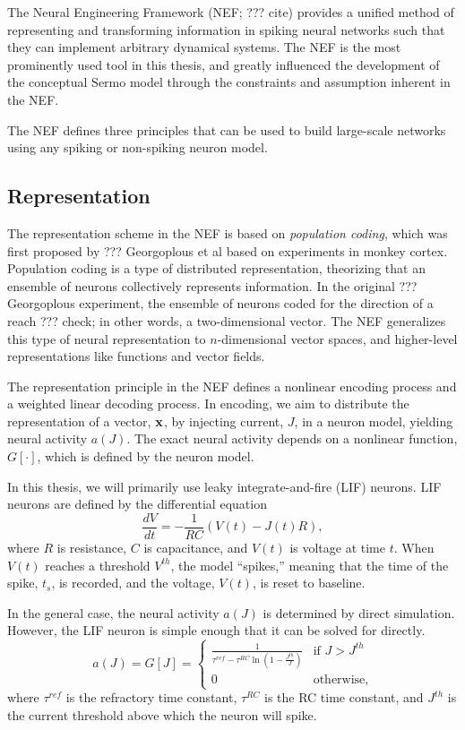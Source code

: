 The Neural Engineering Framework (NEF; ??? cite)
provides a unified method of
representing and transforming information
in spiking neural networks
such that they can implement
arbitrary dynamical systems.
The NEF is the most prominently used
tool in this thesis,
and greatly influenced the
development of the conceptual Sermo model
through the constraints and assumption
inherent in the NEF.

The NEF defines three principles that
can be used to build large-scale networks
using any spiking or non-spiking neuron model.

\subsection{Representation}
\label{sec:representation}

The representation scheme in the NEF
is based on \textit{population coding},
which was first proposed by
??? Georgoplous et al
based on experiments in monkey cortex.
Population coding is a type of distributed representation,
theorizing that an ensemble of neurons
collectively represents information.
In the original ??? Georgoplous experiment,
the ensemble of neurons coded
for the direction of a reach ??? check;
in other words,
a two-dimensional vector.
The NEF generalizes
this type of neural representation to
$n$-dimensional vector spaces,
and higher-level representations
like functions and vector fields.

The representation principle in the NEF
defines a nonlinear encoding process
and a weighted linear decoding process.
In encoding,
we aim to distribute the representation
of a vector, $\mathbf{x}$,
by injecting current, $J$,
in a neuron model,
yielding neural activity $a(J)$.
The exact neural activity depends on
a nonlinear function, $G[\cdot]$,
which is defined by the neuron model.

In this thesis, we will primarily use
leaky integrate-and-fire (LIF) neurons.
LIF neurons are defined by the differential equation
\begin{equation*}
  \frac{dV}{dt} = - \frac{1}{RC} \left(V(t) - J(t) R\right),
\end{equation*}
where $R$ is resistance, $C$ is capacitance,
and $V(t)$ is voltage at time $t$.
When $V(t)$ reaches a threshold $V^{th}$,
the model ``spikes,''
meaning that the time of the spike,
$t_s$, is recorded,
and the voltage, $V(t)$, is reset to baseline.

In the general case,
the neural activity $a(J)$
is determined by direct simulation.
However, the LIF neuron is
simple enough that it can be
solved for directly.
\begin{equation}
  \label{eq:lif-activity-j}
  a(J) = G[J] =
  \begin{cases}
    \textstyle
    \frac{1}{\tau^{ref} - \tau^{RC} \ln \left(1 - \frac{J^{th}}{J}\right)} & \text{if } J > J^{th} \\
    0 & \text{otherwise},
  \end{cases}
\end{equation}
where $\tau^{ref}$ is the refractory time constant,
$\tau^{RC}$ is the RC time constant,
and $J^{th}$ is the current threshold
above which the neuron will spike.

